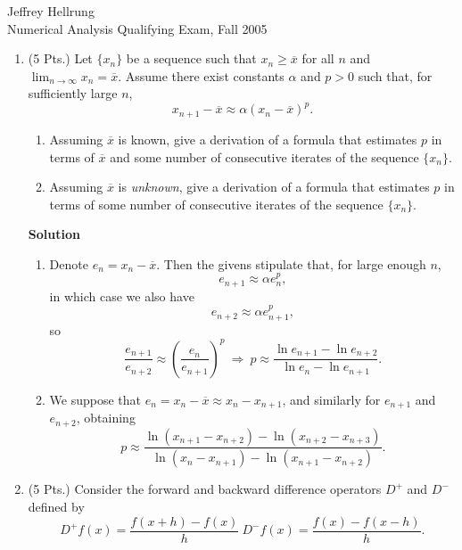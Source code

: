 \documentclass{article}
\begin{document}
\begin{flushright}
Jeffrey Hellrung \\
Numerical Analysis Qualifying Exam, Fall 2005 \\
\end{flushright}


\begin{enumerate}

\item (5 Pts.) Let \(\{x_n\}\) be a sequence such that \(x_n \geq \overline{x}\) for all \(n\) and \(\lim_{n \to \infty} x_n = \overline{x}\).  Assume there exist constants \(\alpha\) and \(p > 0\) such that, for sufficiently large \(n\),
\[x_{n+1} - \overline{x} \approx \alpha \left( x_n - \overline{x} \right)^p.\]

\begin{enumerate}
\item Assuming \(\overline{x}\) is known, give a derivation of a formula that estimates \(p\) in terms of \(\overline{x}\) and some number of consecutive iterates of the sequence \(\{x_n\}\).

\item Assuming \(\overline{x}\) is {\em unknown}, give a derivation of a formula that estimates \(p\) in terms of some number of consecutive iterates of the sequence \(\{x_n\}\).

\end{enumerate}

{\bf Solution}

\begin{enumerate}
\item Denote \(e_n = x_n - \overline{x}\).  Then the givens stipulate that, for large enough \(n\),
\[e_{n+1} \approx \alpha e_n^p,\]
in which case we also have
\[e_{n+2} \approx \alpha e_{n+1}^p,\]
so
\[\frac{e_{n+1}}{e_{n+2}} \approx \left( \frac{e_n}{e_{n+1}} \right)^p \ 
  \Rightarrow \ p \approx \frac{\ln e_{n+1} - \ln e_{n+2}}{\ln e_n - \ln e_{n+1}}.\]

\item We suppose that \(e_n = x_n - \overline{x} \approx x_n - x_{n+1}\), and similarly for \(e_{n+1}\) and \(e_{n+2}\), obtaining
\[p \approx \frac{\ln(x_{n+1} - x_{n+2}) - \ln(x_{n+2} - x_{n+3})}
                 {\ln(x_n - x_{n+1}) - \ln(x_{n+1} - x_{n+2})}.\]

\end{enumerate}



\item (5 Pts.) Consider the forward and backward difference operators \(D^+\) and \(D^-\) defined by
\[D^+f(x) = \frac{f(x + h) - f(x)}{h} \ D^-f(x) = \frac{f(x) - f(x - h)}{h}.\]


\end{enumerate}
\end{document}
